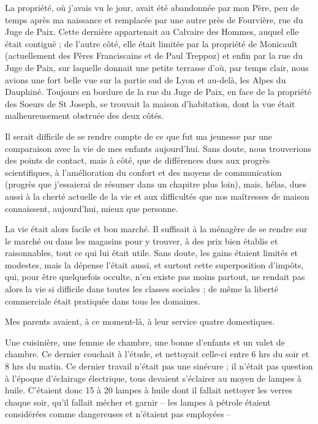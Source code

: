 \documentclass[11pt,a4paper]{report}
\begin{document}
La propriété, où j'avais vu le jour, avait été abandonnée par mon Père, peu de temps après ma naissance et remplacée par une autre près de Fourvière, rue du Juge de Paix. Cette dernière appartenait au Calvaire des Hommes, auquel elle était contiguë ; de l'autre côté, elle était limitée par la propriété de Monicault (actuellement des Pères Franciscains et de Paul Treppoz) et enfin par la rue du Juge de Paix, sur laquelle donnait une petite terrasse d'où, par temps clair, nous avions une fort belle vue sur la partie sud de Lyon et au-delà, les Alpes du Dauphiné. Toujours en bordure de la rue du Juge de Paix, en face de la propriété des Soeurs de St Joseph, se trouvait la maison d'habitation, dont la vue était malheureusement obstruée des deux côtés.

Il serait difficile de se rendre compte de ce que fut ma jeunesse par une comparaison avec la vie de mes enfants aujourd'hui. Sans doute, nous trouverions des points de contact, mais à côté, que de différences dues aux progrès scientifiques, à l'amélioration du confort et des moyens de communication (progrès que j'essaierai de résumer dans un chapitre plus loin), mais, hélas, dues aussi à la cherté actuelle de la vie et aux difficultés que nos maîtresses de maison connaissent, aujourd'hui, mieux que personne.

La vie était alors facile et bon marché. Il suffisait à la ménagère de se rendre sur le marché ou dans les magasins pour y trouver, à des prix bien établis et raisonnables, tout ce qui lui était utile. Sans doute, les gains étaient limités et modestes, mais la dépense l'était aussi, et surtout cette superposition d'impôts, qui, pour être quelquefois occulte, n'en existe pas moins partout, ne rendait pas alors la vie si difficile dans toutes les classes sociales ; de même la liberté commerciale était pratiquée dans tous les domaines.

Mes parents avaient, à ce moment-là, à leur service quatre domestiques.

Une cuisinière, une femme de chambre, une bonne d'enfants et un valet de chambre. Ce dernier couchait à l'étude, et nettoyait celle-ci entre 6 hrs du soir et 8 hrs du matin. Ce dernier travail n'était pas une sinécure ; il n'était pas question à l'époque d'éclairage électrique, tous devaient s'éclairer au moyen de lampes à huile. C'étaient donc 15 à 20 lampes à huile dont il fallait nettoyer les verres chaque soir, qu'il fallait mécher et garnir -- les lampes à pétrole étaient considérées comme dangereuses et n'étaient pas employées --
\end{document}
